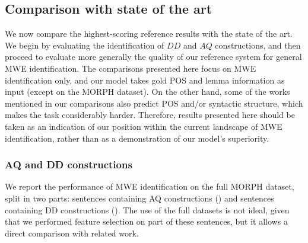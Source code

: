 \documentclass[output=paper,
modfonts
]{langscibook}
\begin{document}
\begin{comment}
FTB-test & 84.03 & 74.71 & 79.10 & 86.72 & 78.47 & 82.39 \\ \hline
\end{tabular}
\caption{Second features selection on FTB-dev with all MWEs}
\label{tab:ftbAllMWEsFine}
\end{table*}

The first important remark is that the results do not vary as much as the case of nominal MWEs, which is logical since the AMs are measures applied on nominal MWEs only. But we remark a similar behaviour that in tests on nominal MWEs. Moreover, the only tests that increase the results are when we remove the dice measure, and when we remove the t measure. Our BEST configuration will be the configuration without the t measure, since when we tried to remove dice and t in the same time, the results decrease. 

Then, we applied the features group BEST to FTB-test, and we obtain a MWE-based F$_1$ score of 79.10\%, and a Token-based score of 82.39\%. 
\end{comment}



\subsection{Comparison with state of the art}
\label{subsec:compare}

We now compare the highest-scoring reference results with the state of the art. We begin by evaluating the identification of $DD$ and $AQ$ constructions, and then proceed to evaluate more generally the quality of our reference system for general MWE identification. The comparisons presented here focus on MWE identification only, and our model takes gold POS and lemma information as input (except on the MORPH dataset). On the other hand, some of the works mentioned in our comparisons also predict POS and/or syntactic structure, which makes the task considerably harder. Therefore, results presented here should be taken as an indication of our position within the current landscape of MWE identification, rather than as a demonstration of our model's superiority.


\subsubsection{AQ and DD constructions}

We report the performance of MWE identification on the full MORPH dataset, split in two parts: sentences containing AQ constructions (\fullAQ) and sentences containing DD constructions (\fullDD). The use of the full datasets is not ideal, given that we performed feature selection on part of these sentences, but it allows a direct comparison with related work. 
\end{document}
